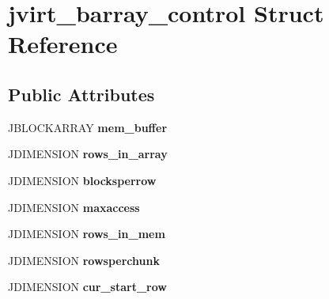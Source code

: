 \hypertarget{structjvirt__barray__control}{}\section{jvirt\+\_\+barray\+\_\+control Struct Reference}
\label{structjvirt__barray__control}
\subsection*{Public Attributes}
\begin{DoxyCompactItemize}
\item 
J\+B\+L\+O\+C\+K\+A\+R\+R\+AY {\bfseries mem\+\_\+buffer}\hypertarget{structjvirt__barray__control_a8afb55dcf60348a5ae746e19315f745e}{}\label{structjvirt__barray__control_a8afb55dcf60348a5ae746e19315f745e}

\item 
J\+D\+I\+M\+E\+N\+S\+I\+ON {\bfseries rows\+\_\+in\+\_\+array}\hypertarget{structjvirt__barray__control_a57c1bf0ff557df3e1e0926e367a6b635}{}\label{structjvirt__barray__control_a57c1bf0ff557df3e1e0926e367a6b635}

\item 
J\+D\+I\+M\+E\+N\+S\+I\+ON {\bfseries blocksperrow}\hypertarget{structjvirt__barray__control_a6c148bce80b027c114ec7d37221cd175}{}\label{structjvirt__barray__control_a6c148bce80b027c114ec7d37221cd175}

\item 
J\+D\+I\+M\+E\+N\+S\+I\+ON {\bfseries maxaccess}\hypertarget{structjvirt__barray__control_a47ffc73c735353eaac752145847cfc92}{}\label{structjvirt__barray__control_a47ffc73c735353eaac752145847cfc92}

\item 
J\+D\+I\+M\+E\+N\+S\+I\+ON {\bfseries rows\+\_\+in\+\_\+mem}\hypertarget{structjvirt__barray__control_a23aa025027bba6a29287b1460d72bf71}{}\label{structjvirt__barray__control_a23aa025027bba6a29287b1460d72bf71}

\item 
J\+D\+I\+M\+E\+N\+S\+I\+ON {\bfseries rowsperchunk}\hypertarget{structjvirt__barray__control_ad31f701b81d11db2bd5fa33579d9674e}{}\label{structjvirt__barray__control_ad31f701b81d11db2bd5fa33579d9674e}

\item 
J\+D\+I\+M\+E\+N\+S\+I\+ON {\bfseries cur\+\_\+start\+\_\+row}\hypertarget{structjvirt__barray__control_ae1e7828cda2f39e8ffdd7e0cc4336f76}{}\label{structjvirt__barray__control_ae1e7828cda2f39e8ffdd7e0cc4336f76}


\end{DoxyCompactItemize}
